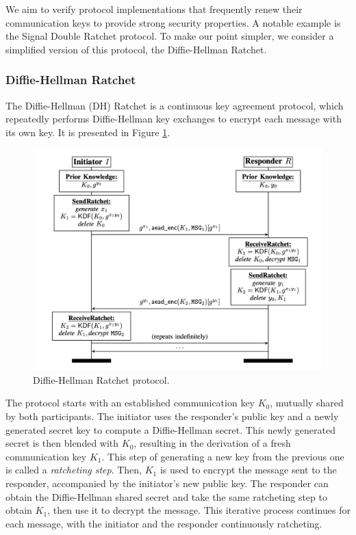 We aim to verify protocol implementations that frequently renew their communication keys to provide strong security properties.
A notable example is the Signal Double Ratchet protocol. To make our point simpler, we consider a simplified version of this protocol, the Diffie-Hellman Ratchet.

\subsubsection{Diffie-Hellman Ratchet}
\label{sec:diffie-hellman-ratchet}

The Diffie-Hellman (DH) Ratchet is a continuous key agreement protocol, which repeatedly performs Diffie-Hellman key exchanges to encrypt each message with its own key.
It is presented in Figure \ref{fig:dh-ratchet}.

\begin{figure}
    \centering
    \includegraphics[width=1.0\textwidth]{figures/DH-ratchet.png}
    \caption{Diffie-Hellman Ratchet protocol.}
    \label{fig:dh-ratchet}
\end{figure}

The protocol starts with an established communication key $K_0$, mutually shared by both participants.
The initiator uses the responder's public key and a newly generated secret key to compute a Diffie-Hellman secret. 
This newly generated secret is then blended with $K_0$, resulting in the derivation of a fresh communication key $K_1$.
This step of generating a new key from the previous one is called a \emph{ratcheting step}.
Then, $K_1$ is used to encrypt the message sent to the responder, accompanied by the initiator's new public key.
The responder can obtain the Diffie-Hellman shared secret and take the same ratcheting step to obtain $K_1$, then use it to decrypt the message.
This iterative process continues for each message, with the initiator and the responder continuously ratcheting.

